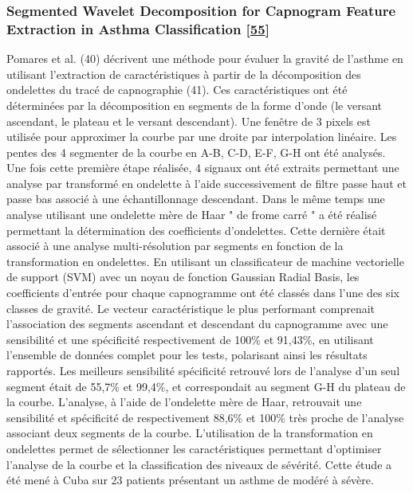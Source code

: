 \documentclass[12pt,]{article}
\begin{document}
\hypertarget{segmented-wavelet-decomposition-for-capnogram-feature-extraction-in-asthma-classification-betancourt2014segmented}{%
\subsubsection{\texorpdfstring{Segmented Wavelet Decomposition for
Capnogram Feature Extraction in Asthma Classification
{[}\protect\hyperlink{ref-betancourt2014segmented}{55}{]}}{Segmented Wavelet Decomposition for Capnogram Feature Extraction in Asthma Classification {[}55{]}}}\label{segmented-wavelet-decomposition-for-capnogram-feature-extraction-in-asthma-classification-betancourt2014segmented}}

Pomares et al. (40) décrivent une méthode pour évaluer la gravité de
l'asthme en utilisant l'extraction de caractéristiques à partir de la
décomposition des ondelettes du tracé de capnographie (41). Ces
caractéristiques ont été déterminées par la décomposition en segments de
la forme d'onde (le versant ascendant, le plateau et le versant
descendant). Une fenêtre de 3 pixels est utilisée pour approximer la
courbe par une droite par interpolation linéaire. Les pentes des 4
segmenter de la courbe en A-B, C-D, E-F, G-H ont été analysés. Une fois
cette première étape réalisée, 4 signaux ont été extraits permettant une
analyse par transformé en ondelette à l'aide successivement de filtre
passe haut et passe bas associé à une échantillonnage descendant. Dans
le même temps une analyse utilisant une ondelette mère de Haar " de
frome carré " a été réalisé permettant la détermination des coefficients
d'ondelettes. Cette dernière était associé à une analyse
multi-résolution par segments en fonction de la transformation en
ondelettes. En utilisant un classificateur de machine vectorielle de
support (SVM) avec un noyau de fonction Gaussian Radial Basis, les
coefficients d'entrée pour chaque capnogramme ont été classés dans l'une
des six classes de gravité. Le vecteur caractéristique le plus
performant comprenait l'association des segments ascendant et descendant
du capnogramme avec une sensibilité et une spécificité respectivement de
100\% et 91,43\%, en utilisant l'ensemble de données complet pour les
tests, polarisant ainsi les résultats rapportés. Les meilleurs
sensibilité spécificité retrouvé lors de l'analyse d'un seul segment
était de 55,7\% et 99,4\%, et correspondait au segment G-H du plateau de
la courbe. L'analyse, à l'aide de l'ondelette mère de Haar, retrouvait
une sensibilité et spécificité de respectivement 88,6\% et 100\% très
proche de l'analyse associant deux segments de la courbe. L'utilisation
de la transformation en ondelettes permet de sélectionner les
caractéristiques permettant d'optimiser l'analyse de la courbe et la
classification des niveaux de sévérité. Cette étude a été mené à Cuba
sur 23 patients présentant un asthme de modéré à sévère.
\end{document}
